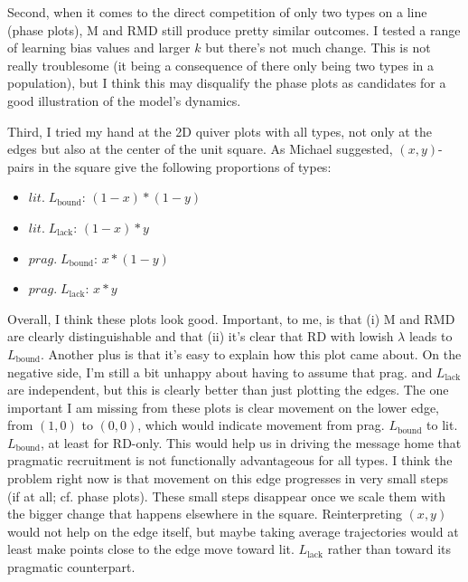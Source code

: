 \documentclass[fleqn,reqno,10pt]{article}
\newcommand{\mylang}[1]{\ensuremath{L_{\text{#1}}}\xspace} %
\newcommand{\Lbound}{\mylang{bound}}
\newcommand{\Llack}{\mylang{lack}}
\begin{document}
Second, when it comes to the direct competition of only two types on a line (phase plots), M and RMD still produce pretty similar outcomes. I tested a range of learning bias values and larger $k$ but there's not much change. This is not really troublesome (it being a consequence of there only being two types in a population), but I think this may disqualify the phase plots as candidates for a good illustration of the model's dynamics. 

Third, I tried my hand at the 2D quiver plots with all types, not only at the edges but also at the center of the unit square. As Michael suggested, $(x,y)$-pairs in the square give the following proportions of types:
\begin{itemize} 
  \item $lit. \; \Lbound$: $(1-x) * (1-y)$ 
  \item $lit. \; \Llack$: $(1-x) * y$
  \item $prag.\; \Lbound$: $x * (1-y)$
  \item $prag.\; \Llack$: $x * y$
\end{itemize}

Overall, I think these plots look good. Important, to me, is that (i) M and RMD are clearly distinguishable and that (ii) it's clear that RD with lowish $\lambda$ leads to $\Lbound$. Another plus is that it's easy to explain how this plot came about. On the negative side, I'm still a bit unhappy about having to assume that prag. and $\Llack$ are independent, but this is clearly better than just plotting the edges. The one important I am missing from these plots is clear movement on the lower edge, from $(1,0)$ to $(0,0)$, which would indicate movement from prag. $\Lbound$ to lit. $\Lbound$,  at least for RD-only. This would help us in driving the message home that pragmatic recruitment is not functionally advantageous for all types. I think the problem right now is that movement on this edge progresses in very small steps (if at all; cf. phase plots). These small steps disappear once we scale them with the bigger change that happens elsewhere in the square. Reinterpreting $(x,y)$ would not help on the edge itself, but maybe taking average trajectories would at least make points close to the edge move toward lit. $\Llack$ rather than toward its pragmatic counterpart. 
\end{document}
